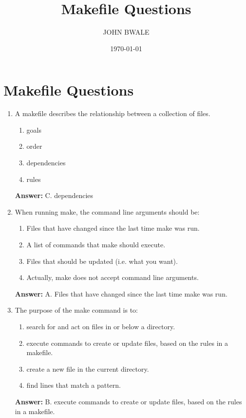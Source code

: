 \documentclass{article}
\begin{document}
\title{Makefile Questions}
\author{JOHN BWALE}
\date{\today}

\maketitle

\section*{Makefile Questions}

\begin{enumerate}
    \item A makefile describes the relationship between a collection of files.
    \begin{enumerate}
        \item goals
        \item order
        \item dependencies
        \item rules
    \end{enumerate}
    \textbf{Answer:} C. dependencies

    \item When running make, the command line arguments should be:
    \begin{enumerate}
        \item Files that have changed since the last time make was run.
        \item A list of commands that make should execute.
        \item Files that should be updated (i.e. what you want).
        \item Actually, make does not accept command line arguments.
    \end{enumerate}
    \textbf{Answer:} A. Files that have changed since the last time make was run.

    \item The purpose of the make command is to:
    \begin{enumerate}
        \item search for and act on files in or below a directory.
        \item execute commands to create or update files, based on the rules in a makefile.
        \item create a new file in the current directory.
        \item find lines that match a pattern.
    \end{enumerate}
    \textbf{Answer:} B. execute commands to create or update files, based on the rules in a makefile.


\end{enumerate}
\end{document}
